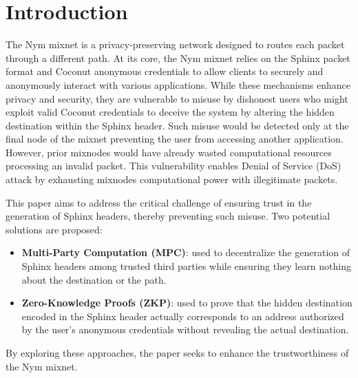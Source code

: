 \section{Introduction}

The Nym mixnet \cite{nym} is a privacy-preserving network designed to routes each packet through a different path.
At its core, the Nym mixnet relies on the Sphinx \cite{sphinx} packet format and Coconut \cite{coconut} anonymous credentials to allow clients to securely and anonymously interact with various applications.
While these mechanisms enhance privacy and security, they are vulnerable to misuse by dishonest users who might exploit valid Coconut credentials to deceive the system by altering the hidden destination within the Sphinx header.
Such misuse would be detected only at the final node of the mixnet preventing the user from accessing another application. 
However, prior mixnodes would have already wasted computational resources processing an invalid packet. 
This vulnerability enables Denial of Service (DoS) attack by exhausting mixnodes computational power with illegitimate packets.
\newline

This paper aims to address the critical challenge of ensuring trust in the generation of Sphinx headers, thereby preventing such misuse. 
Two potential solutions are proposed: 
\begin{itemize}
    \item \textbf{Multi-Party Computation (MPC)}:
    used to decentralize the generation of Sphinx headers among trusted third parties while ensuring they learn nothing about the destination or the path.
    \item \textbf{Zero-Knowledge Proofs (ZKP)}: used to prove that the hidden destination encoded in the Sphinx header actually corresponds to an address authorized by the user’s anonymous credentials without revealing the actual destination. 
\end{itemize}
By exploring these approaches, the paper seeks to enhance the trustworthiness of the Nym mixnet.
